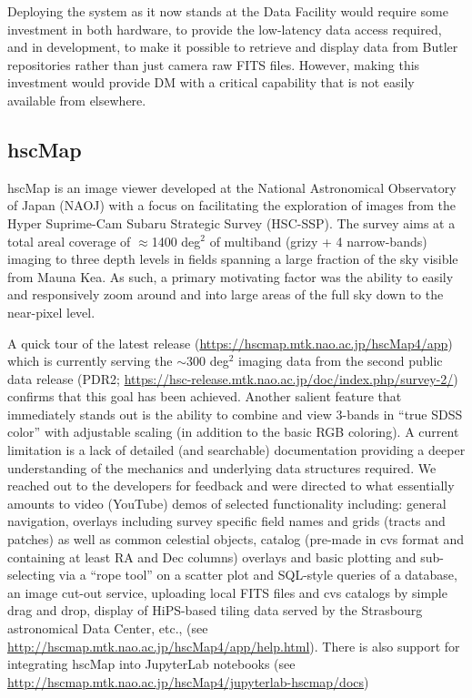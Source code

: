 Deploying the system as it now stands at the Data Facility would require some investment in both hardware, to provide the low-latency data access required, and in development, to make it possible to retrieve and display data from Butler repositories rather than just camera raw FITS files.
However, making this investment would provide DM with a critical capability that is not easily available from elsewhere.



\subsection{hscMap}
\label{sec:existing_tools:hscMap}

hscMap is an image viewer developed at the National Astronomical Observatory of Japan (NAOJ) with a focus on facilitating the exploration of images from the Hyper Suprime-Cam Subaru Strategic Survey (HSC-SSP).
The survey aims at a total areal coverage of $\approx$1400 deg$^2$ of multiband (grizy + 4 narrow-bands) imaging to three depth levels in fields spanning a large fraction of the sky visible from Mauna Kea.
As such, a primary motivating factor was the ability to easily and responsively zoom around and into large areas of the full sky down to the near-pixel level.


A quick tour of the latest release (\url{https://hscmap.mtk.nao.ac.jp/hscMap4/app}) which is currently serving the $\sim$300 deg$^2$ imaging data from the second public data release (PDR2; \url{https://hsc-release.mtk.nao.ac.jp/doc/index.php/survey-2/}) confirms that this goal has been achieved.
Another salient feature that immediately stands out is the ability to combine and view 3-bands in ``true SDSS color'' \citep{2004PASP..116..133L} with adjustable scaling (in addition to the basic RGB coloring).
A current limitation is a lack of detailed (and searchable) documentation providing a deeper understanding of the mechanics and underlying data structures required.
We reached out to the developers for feedback and were directed to what essentially amounts to video (YouTube) demos of selected functionality including: general navigation, overlays including survey specific field names and grids (tracts and patches) as well as common celestial objects, catalog (pre-made in cvs format and containing at least RA and Dec columns) overlays and basic plotting and sub-selecting via a ``rope tool'' on a scatter plot and SQL-style queries of a database, an image cut-out service, uploading local FITS files and cvs catalogs by simple drag and drop, display of HiPS-based tiling data served by the Strasbourg astronomical Data Center, etc., (see \url{http://hscmap.mtk.nao.ac.jp/hscMap4/app/help.html}).
There is also support for integrating hscMap into JupyterLab notebooks (see \url{http://hscmap.mtk.nao.ac.jp/hscMap4/jupyterlab-hscmap/docs})

